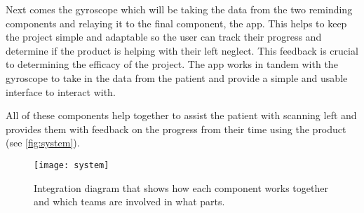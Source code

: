 Next comes the gyroscope which will be taking the data from the two reminding
components and relaying it to the final component, the app. This helps to keep
the project simple and adaptable so the user can track their progress and
determine if the product is helping with their left neglect. This feedback is
crucial to determining the efficacy of the project. The app works in tandem with
the gyroscope to take in the data from the patient and provide a simple and
usable interface to interact with. 

All of these components help together to assist the patient with scanning left
and provides them with feedback on the progress from their time using the
product (see \autoref{fig:system}). 

\begin{figure}[h]
  \centering
  \texttt{[image: system]}
  \caption{Integration diagram that shows how each component works together and
    which teams are involved in what parts.} 
  \label{fig:system}
\end{figure}

